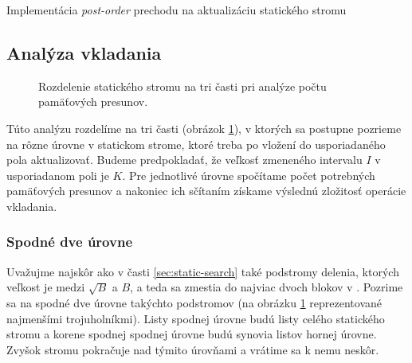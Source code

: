 \begin{algorithm}
    \caption{Implementácia \emph{post-order} prechodu na aktualizáciu statického stromu}
    \label{alg:postorder}
    \begin{algorithmic}[1]
         
        \Statex {}
        \Statex
             
                \State \Return {}
            \EndIf
            \Statex
            \Else
                \State {} 
                \State {} 
                \Statex
                 
            \EndIf           
        \EndFunction
    \end{algorithmic}
\end{algorithm}

\subsection{Analýza vkladania}

\begin{figure}
    \centering
    \resizebox{\textwidth}{!}{
        
    }
    \caption[Rozdelenie statického stromu]{Rozdelenie statického stromu na tri časti pri analýze počtu pamäťových presunov.}
    \label{fig:cobtree_analysis_parts}
\end{figure}

Túto analýzu rozdelíme na tri časti (obrázok \ref{fig:cobtree_analysis_parts}), v ktorých sa postupne pozrieme na rôzne úrovne v statickom strome, ktoré treba po vložení do usporiadaného pola aktualizovať. Budeme predpokladať, že veľkosť zmeneného intervalu $I$ v usporiadanom poli je $K$. Pre jednotlivé úrovne spočítame počet potrebných pamäťových presunov a nakoniec ich sčítaním získame výslednú zložitosť operácie vkladania.

\subsubsection{Spodné dve úrovne}
Uvažujme najskôr ako v časti \ref{sec:static-search} také podstromy  delenia, ktorých veľkost je medzi $\sqrt{B}$ a $B$, a teda sa zmestia do najviac dvoch blokov v \cache. Pozrime sa na spodné dve úrovne takýchto podstromov (na obrázku \ref{fig:cobtree_analysis_parts} reprezentované najmenšími trojuholníkmi). Listy spodnej úrovne budú listy celého statického stromu a korene spodnej spodnej úrovne budú synovia listov hornej úrovne. Zvyšok stromu pokračuje nad týmito úrovňami a vrátime sa k nemu neskôr.

